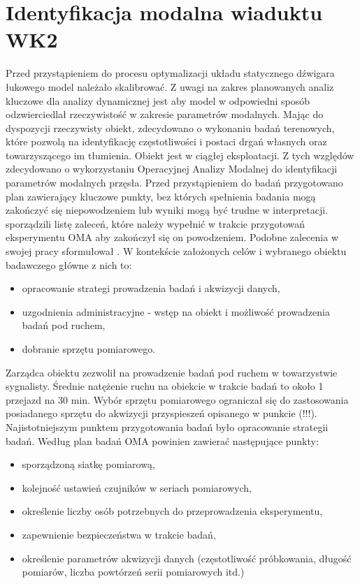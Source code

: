 \section{Identyfikacja modalna wiaduktu WK2} \label{sect: identyfikacja_modalna_wk2}
Przed przystąpieniem do procesu optymalizacji układu statycznego dźwigara łukowego model należało skalibrować. Z uwagi na zakres planowanych analiz kluczowe dla analizy dynamicznej jest aby model w odpowiedni sposób odzwierciedlał rzeczywistość w zakresie parametrów modalnych. Mając do dyspozycji rzeczywisty obiekt, zdecydowano o wykonaniu badań terenowych, które pozwolą na identyfikację częstotliwości i postaci drgań własnych oraz towarzyszącego im tłumienia. Obiekt jest w ciągłej eksploatacji. Z tych względów zdecydowano o wykorzystaniu Operacyjnej Analizy Modalnej do identyfikacji parametrów modalnych przęsła.
Przed przystąpieniem do badań przygotowano plan zawierający kluczowe punkty, bez których spełnienia badania mogą zakończyć się niepowodzeniem lub wyniki mogą być trudne w interpretacji. \cite{Brincker2015} sporządzili listę zaleceń, które należy wypełnić w trakcie przygotowań eksperymentu OMA aby zakończył się on powodzeniem. Podobne zalecenia w swojej pracy sformułował \cite{Poprawa2018}. W kontekście założonych celów i wybranego obiektu badawczego główne z nich to:
\begin{itemize}[noitemsep]
\item opracowanie strategi prowadzenia badań i akwizycji danych,
\item uzgodnienia administracyjne - wstęp na obiekt i możliwość prowadzenia badań pod ruchem,
\item dobranie sprzętu pomiarowego.
\end{itemize}

Zarządca obiektu zezwolił na prowadzenie badań pod ruchem w towarzystwie sygnalisty. Średnie natężenie ruchu na obiekcie w trakcie badań to około 1 przejazd na 30 min. Wybór sprzętu pomiarowego ograniczał się do zastosowania posiadanego sprzętu do akwizycji przyspieszeń opisanego w punkcie (!!!). Najistotniejszym punktem przygotowania badań było opracowanie strategii badań. Według \cite{Brincker2015} plan badań OMA powinien zawierać następujące punkty:
\begin{itemize}[noitemsep]
	\item sporządzoną siatkę pomiarową,
	\item kolejność ustawień czujników w seriach pomiarowych,
	\item określenie liczby osób potrzebnych do przeprowadzenia eksperymentu,
	\item zapewnienie bezpieczeństwa w trakcie badań,
	\item określenie parametrów akwizycji danych (częstotliwość próbkowania, długość pomiarów, liczba powtórzeń serii pomiarowych itd.)
\end{itemize}

